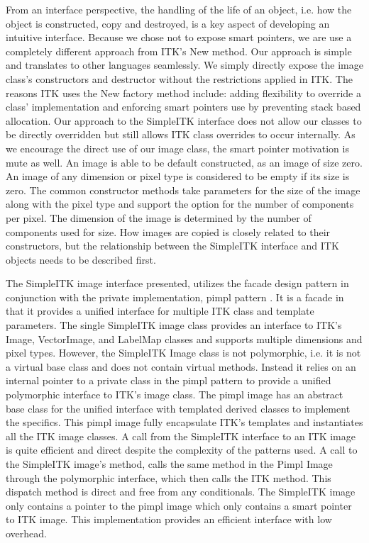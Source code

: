 \documentclass{frontiersMED} %
\begin{document}
From an interface perspective, the handling of the life of an object,
i.e. how the object is constructed, copy and destroyed, is a key
aspect of developing an intuitive interface. Because we chose not to
expose smart pointers, we are use a completely different approach from
ITK's New method. Our approach is simple and translates to other
languages seamlessly. We simply directly expose the image class's
constructors and destructor without the restrictions applied in
ITK. The reasons ITK uses the New factory method include: adding
flexibility to override a class' implementation and enforcing smart
pointers use by preventing stack based allocation. Our approach to the
SimpleITK interface does not allow our classes to be directly
overridden but still allows ITK class overrides to occur
internally. As we encourage the direct use of our image class, the
smart pointer motivation is mute as well. An image is able to be
default constructed, as an image of size zero. An image of any
dimension or pixel type is considered to be empty if its size is
zero. The common constructor methods take parameters for the size of
the image along with the pixel type and support the option for the
number of components per pixel. The dimension of the image is
determined by the number of components used for size. How images are
copied is closely related to their constructors, but the relationship
between the SimpleITK interface and ITK objects needs to be described
first.

The SimpleITK image interface presented, utilizes the facade design
pattern in conjunction with the private implementation, pimpl pattern
\cite{Sutter1999}. It is a facade in that it provides a unified interface
for multiple ITK class and template parameters. The single SimpleITK
image class provides an interface to ITK's Image, VectorImage, and
LabelMap classes and supports  multiple dimensions and pixel
types. However, the SimpleITK Image class is not polymorphic, i.e. it
is not a virtual base class and does not contain virtual
methods. Instead it relies on an internal pointer to a private class
in the pimpl pattern to provide a unified polymorphic interface to
ITK's image class. The pimpl image has an abstract base class for the
unified interface with templated derived classes to implement the
specifics. This pimpl image fully encapsulate ITK's templates and
instantiates all the ITK image classes. A call from the SimpleITK
interface to an ITK image is quite efficient and direct despite the
complexity of the patterns used. A call to the SimpleITK image's
method, calls the same method in the Pimpl Image through the
polymorphic interface, which then calls the ITK method. This dispatch
method is direct and free from any conditionals. The SimpleITK image
only contains a pointer to the pimpl image which only contains a smart
pointer to ITK image. This implementation provides an efficient
interface with low overhead.
\end{document}
